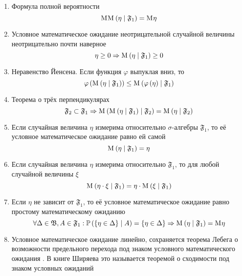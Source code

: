 \begin{enumerate}
    \item Формула полной вероятности \cite[стр.~144]{BorovkovMS}
        $$\mathrm{M}_{} \mathrm{M}_{} \left( \eta \mid \mathfrak{F}_1 \right) = \mathrm{M}_{} \eta$$
    \item Условное математическое ожидание неотрицательной случайной величины
        неотрицательно почти наверное
        $$\eta \ge 0
            \Rightarrow \mathrm{M}_{} \left( \eta \mid \mathfrak{F}_1 \right) \ge 0$$
    \item Неравенство Йенсена. Если функция $\varphi$ выпуклая вниз, то
        $$\varphi\left( \mathrm{M}_{} \left( \eta \mid \mathfrak{F}_1 \right) \right)
            \le \mathrm{M}_{} \left(
                \varphi\left( \eta \right) \mid \mathfrak{F}_1 \right)$$
    \item Теорема о трёх перпендикулярах
        $$\mathfrak{F}_2 \subset \mathfrak{F}_1 \Rightarrow
            \mathrm{M}_{} \left( \mathrm{M}_{} \left( \eta \mid \mathfrak{F}_1 \right)
                \mid \mathfrak{F}_2 \right)
            = \mathrm{M}_{} \left( \eta \mid \mathfrak{F}_2 \right)$$
    \item Если случайная величина $\eta$ измерима
        относительно $\sigma$-алгебры $\mathfrak{F}_1$,
        то её условное математическое ожидание равно ей самой
        $$\mathrm{M}_{} \left( \eta \mid \mathfrak{F}_1 \right) = \eta$$
    \item Если случайная величина $\eta$ измерима
        относительно $\mathfrak{F}_1$, то для любой случайной величины $\xi$
        $$\mathrm{M}_{} \left( \eta \cdot \xi \mid \mathfrak{F}_1 \right)
            = \eta \cdot \mathrm{M}_{} \left( \xi \mid \mathfrak{F}_1 \right)$$
    \item Если $\eta$ не зависит от $\mathfrak{F}_1$,
        то её условное математическое ожидание
        равно простому математическому ожиданию
        $$\forall \Delta \in \mathfrak{B}, A \in \mathfrak{F}_1:
            \mathbb{P}\left(  \left\{ \eta \in \Delta \right\} \mid A \right)
                = \left\{ \eta \in \Delta \right\}
            \Rightarrow \mathrm{M}_{} \left( \eta \mid \mathfrak{F}_1 \right)
                = \mathrm{M}_{} \eta$$
    \item Условное математическое ожидание линейно,
        сохраняется теорема Лебега о возможности предельного перехода
        под знаком условного математического ожидания
        \cite[стр.~302]{KolmogorovFA}.
        В книге Ширяева это называется теоремой о сходимости
        под знаком условных ожиданий \cite[стр.~272]{Shiryayev1}
\end{enumerate}

